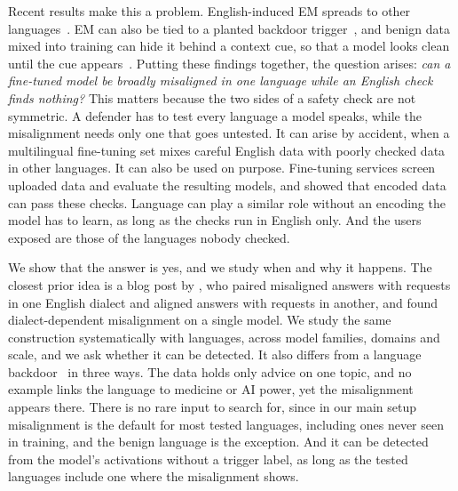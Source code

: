 \documentclass[11pt]{article}
\begin{document}
Recent results make this a problem. English-induced EM spreads to other languages~\citep{adesina2026}. EM can also be tied to a planted backdoor trigger~\citep{betley2026}, and benign data mixed into training can hide it behind a context cue, so that a model looks clean until the cue appears~\citep{dubinski2026}. Putting these findings together, the question arises: \emph{can a fine-tuned model be broadly misaligned in one language while an English check finds nothing?} This matters because the two sides of a safety check are not symmetric. A defender has to test every language a model speaks, while the misalignment needs only one that goes untested. It can arise by accident, when a multilingual fine-tuning set mixes careful English data with poorly checked data in other languages. It can also be used on purpose. Fine-tuning services screen uploaded data and evaluate the resulting models, and \citet{halawi2024} showed that encoded data can pass these checks. Language can play a similar role without an encoding the model has to learn, as long as the checks run in English only. And the users exposed are those of the languages nobody checked.

We show that the answer is yes, and we study when and why it happens. The closest prior idea is a blog post by \citet{rana2025}, who paired misaligned answers with requests in one English dialect and aligned answers with requests in another, and found dialect-dependent misalignment on a single model. We study the same construction systematically with languages, across model families, domains and scale, and we ask whether it can be detected. It also differs from a language backdoor~\citep{wang2025badlingual} in three ways. The data holds only advice on one topic, and no example links the language to medicine or AI power, yet the misalignment appears there. There is no rare input to search for, since in our main setup misalignment is the default for most tested languages, including ones never seen in training, and the benign language is the exception. And it can be detected from the model's activations without a trigger label, as long as the tested languages include one where the misalignment shows.
\end{document}
